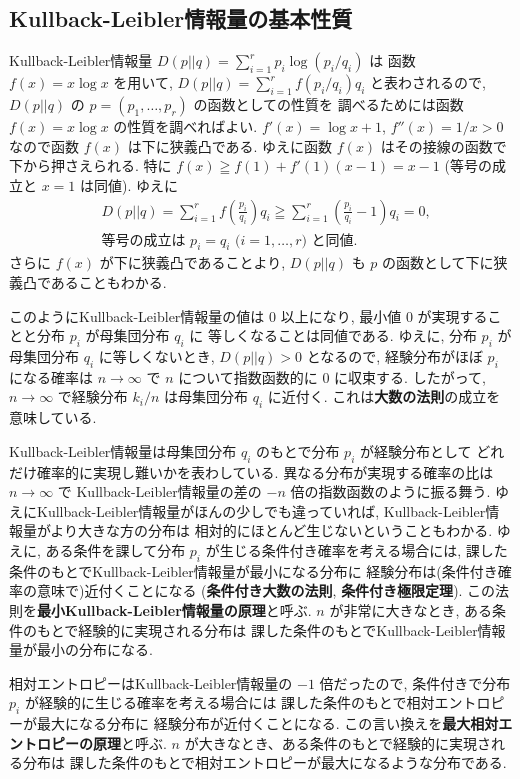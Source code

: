 \documentclass[12pt,twoside]{jarticle}
\theoremstyle{definition} %
\theoremstyle{definition} %
\theoremstyle{definition} %
\numberwithin{theorem}{section}
\numberwithin{equation}{section}
\numberwithin{figure}{section}
\numberwithin{table}{section}
\begin{document}
\subsection{Kullback-Leibler情報量の基本性質}
\label{sec:KL-prop}

Kullback-Leibler情報量 $D(p||q)=\sum_{i=1}^r p_i\log(p_i/q_i)$ は
函数 $f(x)=x\log x$ を用いて, 
$D(p||q)=\sum_{i=1}^r f(p_i/q_i)q_i$ と表わされるので, 
$D(p||q)$ の $p=(p_1,\ldots,p_r)$ の函数としての性質を
調べるためには函数 $f(x)=x\log x$ の性質を調べればよい.
$f'(x)=\log x + 1$, $f''(x)=1/x>0$ なので函数 $f(x)$ は下に狭義凸である.
ゆえに函数 $f(x)$ はその接線の函数で下から押さえられる.
特に $f(x)\geqq f(1)+f'(1)(x-1)=x-1$ (等号の成立と $x=1$ は同値).
ゆえに
\begin{align*}
&
D(p||q)
=\sum_{i=1}^r f\left(\frac{p_i}{q_i}\right)q_i
\geqq \sum_{i=1}^r\left(\frac{p_i}{q_i}-1\right)q_i
=0,
\\ &
\text{等号の成立は $p_i=q_i$ ($i=1,\ldots,r$) と同値.}
\end{align*}
さらに $f(x)$ が下に狭義凸であることより, 
$D(p||q)$ も $p$ の函数として下に狭義凸であることもわかる.

このようにKullback-Leibler情報量の値は $0$ 以上になり, 
最小値 $0$ が実現することと分布 $p_i$ が母集団分布 $q_i$ に
等しくなることは同値である.
ゆえに, 分布 $p_i$ が母集団分布 $q_i$ に等しくないとき, 
$D(p||q)>0$ となるので, 
経験分布がほぼ $p_i$ になる確率は $n\to\infty$ で
$n$ について指数函数的に $0$ に収束する.
したがって, $n\to\infty$ で経験分布 $k_i/n$ は母集団分布 $q_i$ に近付く.
これは{\bf 大数の法則}の成立を意味している.

Kullback-Leibler情報量は母集団分布 $q_i$ のもとで分布 $p_i$ が経験分布として
どれだけ確率的に実現し難いかを表わしている.
異なる分布が実現する確率の比は $n\to\infty$ で
Kullback-Leibler情報量の差の $-n$ 倍の指数函数のように振る舞う.
ゆえにKullback-Leibler情報量がほんの少しでも違っていれば, 
Kullback-Leibler情報量がより大きな方の分布は
相対的にほとんど生じないということもわかる.
ゆえに, ある条件を課して分布 $p_i$ が生じる条件付き確率を考える場合には, 
課した条件のもとでKullback-Leibler情報量が最小になる分布に
経験分布は(条件付き確率の意味で)近付くことになる
({\bf 条件付き大数の法則}, {\bf 条件付き極限定理}).
この法則を{\bf 最小Kullback-Leibler情報量の原理}と呼ぶ.
$n$ が非常に大きなとき, ある条件のもとで経験的に実現される分布は
課した条件のもとでKullback-Leibler情報量が最小の分布になる.

相対エントロピーはKullback-Leibler情報量の $-1$ 倍だったので,
条件付きで分布 $p_i$ が経験的に生じる確率を考える場合には
課した条件のもとで相対エントロピーが最大になる分布に
経験分布が近付くことになる.
この言い換えを{\bf 最大相対エントロピーの原理}と呼ぶ.
$n$ が大きなとき、ある条件のもとで経験的に実現される分布は
課した条件のもとで相対エントロピーが最大になるような分布である.
\end{document}

